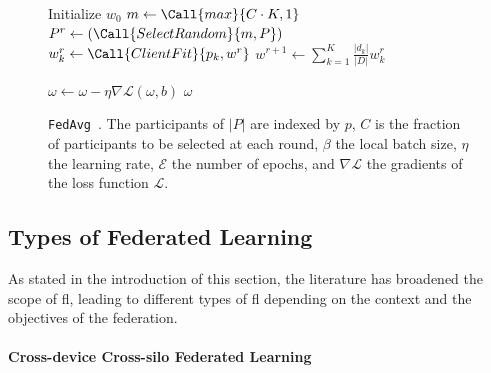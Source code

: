 \begin{figure}
  \centering
  \begin{minipage}{.8\textwidth}
    
    \begin{algorithm}[H]
      \caption{
        \texttt{FedAvg}~\cite{mcmahan_Communicationefficientlearningdeep_2017}.
        The participants of $|P|$ are indexed by $p$, $C$ is the fraction of participants to be selected at each round, $\beta$ the local batch size, $\eta$ the learning rate, $\mathcal{E}$ the number of epochs, and $\nabla\mathcal{L}$ the gradients of the loss function $\mathcal{L}$.
        \label{alg:fedavg}
      }
      \begin{algorithmic}[1]
      
        \State Initialize $w_0$
          \State $ m \gets \Call{max}{C \cdot K, 1} $
          \State $ P^r \gets (\Call{SelectRandom}{m, P}) $
            \State $ w_k^r \gets \Call{ClientFit}{p_k, w^r} $
          \EndFor
          \State $ w^{r+1} \gets \sum_{k=1}^{K} \frac{|d_k|}{|D|} w_k^r $
        \EndFor
    
        \Statex
              \State $ \omega \gets \omega - \eta \nabla \mathcal{L}(\omega,b) $
            \EndFor
          \EndFor
          \Statex
          \State \Return $\omega$
        \EndFunction
      \end{algorithmic}
    \end{algorithm}
  \end{minipage}
\end{figure}


\subsection{Types of Federated Learning\label{sec:bg.fl.types}}

As stated in the introduction of this section, the literature has broadened the scope of \gls{fl}, leading to different types of \gls{fl} depending on the context and the objectives of the federation.

\paragraph{Cross-device \vs Cross-silo Federated Learning}

